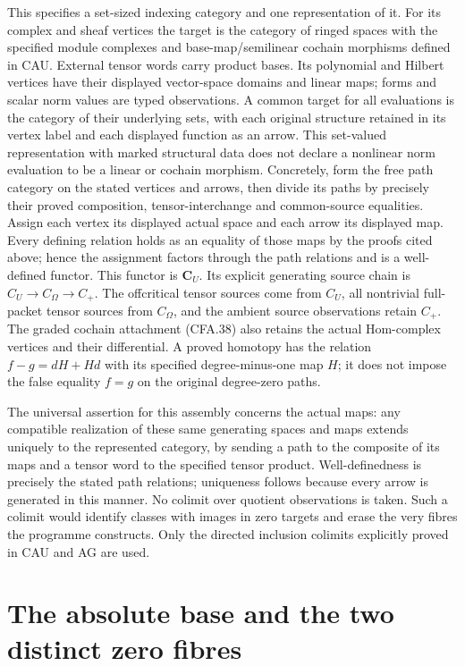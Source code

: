 This specifies a set-sized indexing category and one representation of it.
For its complex and sheaf vertices the target is the category of
ringed spaces with the specified module complexes and base-map/semilinear
cochain morphisms defined in CAU. External tensor words carry product
bases. Its polynomial and Hilbert vertices have their displayed
vector-space domains and linear maps; forms and scalar norm values
are typed observations. A common target for all evaluations is the
category of their underlying sets, with each original structure
retained in its vertex label and each displayed function as an arrow.
This set-valued representation with marked structural data does not
declare a nonlinear norm evaluation to be a linear or cochain morphism.
Concretely, form the free path category on the stated vertices and
arrows, then divide its paths by precisely their proved composition,
tensor-interchange and common-source equalities.  Assign each
vertex its displayed actual space and each arrow its displayed map.
Every defining relation holds as an equality of those maps by the
proofs cited above; hence the assignment factors through the path
relations and is a well-defined functor.  This functor is
$\mathbf C_U$. Its explicit generating source chain is
$C_U\to C_\Omega\to C_+$. The offcritical tensor sources come
from $C_U$, all nontrivial full-packet tensor sources from
$C_\Omega$, and the ambient source observations retain $C_+$.
The graded cochain attachment (CFA.38) also retains the actual
Hom-complex vertices and their differential. A proved homotopy
has the relation $f-g=dH+Hd$ with its specified degree-minus-one
map $H$; it does not impose the false equality $f=g$ on the
original degree-zero paths.

The universal assertion for this assembly concerns the actual
maps: any compatible realization of these same generating spaces
and maps extends uniquely to the represented category, by sending
a path to the composite of its maps and a tensor word to the
specified tensor product.  Well-definedness is precisely the
stated path relations; uniqueness follows because every arrow is
generated in this manner.  No colimit over quotient observations
is taken.  Such a colimit would identify classes with images in
zero targets and erase the very fibres the programme constructs.
Only the directed inclusion colimits explicitly proved in CAU
and AG are used.

\section{The absolute base and the two distinct zero fibres}

